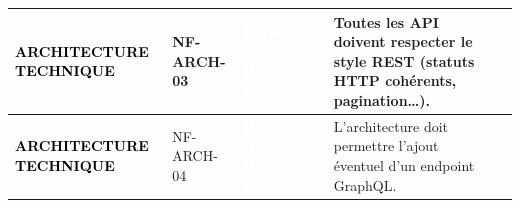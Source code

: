 \begin{longtable}{|P{2.15cm}|P{1.55cm}|P{2.35cm}|P{5.60cm}|P{1.65cm}|P{1.45cm}|}
\textcolor{black}{\textbf{ARCHITECTURE TECHNIQUE}} & NF-ARCH-03 & \textcolor{white}{\textbf{Backend / API \& Base de Données}} & Toutes les API doivent respecter le style REST (statuts HTTP cohérents, pagination…). &  &  \\ \hline
{}
\textcolor{black}{\textbf{ARCHITECTURE TECHNIQUE}} & NF-ARCH-04 & \textcolor{white}{\textbf{Backend / API \& Base de Données}} & L’architecture doit permettre l’ajout éventuel d’un endpoint GraphQL. &  &  \\ \hline
\end{longtable}
\endgroup
